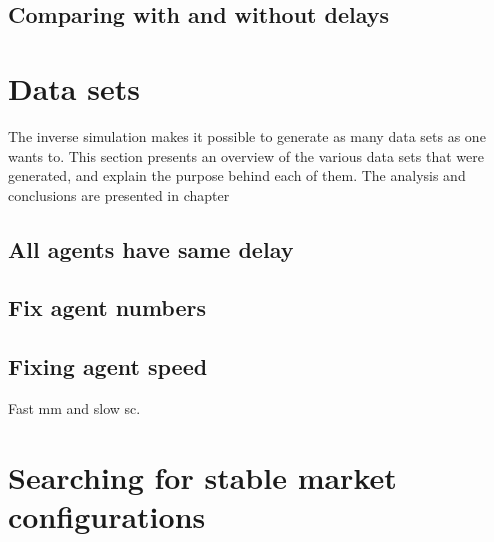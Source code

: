 \subsection{Comparing with and without delays}

\section{Data sets} %
The inverse simulation makes it possible to generate as many data sets as one wants to. This section presents an overview of the various data sets that were generated, and explain the purpose behind each of them. The analysis and conclusions are presented in chapter \label{chapter:model}

\label{sec:data_sets}

\subsection{All agents have same delay} %
\label{sub:all_agents_have_same_delay}


\subsection{Fix agent numbers} %
\label{sub:fixing_agent_numbers}


\subsection{Fixing agent speed} %
\label{sub:fixing_agent_speed}
Fast mm and slow sc.




\section{Searching for stable market configurations}


